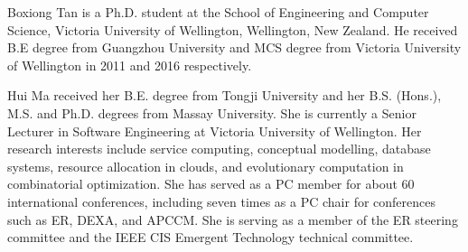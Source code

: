 \documentclass[10pt,journal,compsoc]{IEEEtran}
\begin{document}
\vspace{-5 mm}



\small
\begin{IEEEbiography}{Boxiong Tan}
is a Ph.D. student at the School of Engineering and Computer Science, Victoria University of
Wellington, Wellington, New Zealand. He received B.E degree from Guangzhou University and MCS degree from Victoria University of
Wellington in 2011 and 2016 respectively.
\end{IEEEbiography}
\vspace{-9.5 mm}
\begin{IEEEbiography}{Hui Ma}
received her B.E. degree from Tongji University and her B.S. (Hons.), M.S. and Ph.D. degrees from Massay University. She is currently a Senior Lecturer in Software Engineering at Victoria University of Wellington. Her research interests include service computing, conceptual modelling, database systems, resource allocation in clouds, and evolutionary computation in combinatorial optimization. She has served as a PC member for about 60 international conferences, including seven times as a PC chair for conferences such as ER, DEXA, and APCCM. She is serving as a member of the ER steering committee and the IEEE CIS Emergent Technology technical committee.
\end{IEEEbiography}
\vspace{-9.5 mm}
\end{document}
